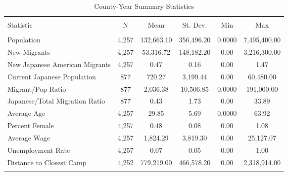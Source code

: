 
\begin{table}[!htbp] \centering 
  \caption{County-Year Summary Statistics} 
  \label{ctysumstats} 
\begin{tabular}{@{\extracolsep{5pt}}lccccc} 
\\[-1.8ex]\hline 
\hline \\[-1.8ex] 
Statistic & \multicolumn{1}{c}{N} & \multicolumn{1}{c}{Mean} & \multicolumn{1}{c}{St. Dev.} & \multicolumn{1}{c}{Min} & \multicolumn{1}{c}{Max} \\ 
\hline \\[-1.8ex] 
Population & 4,257 & 132,663.10 & 356,496.20 & 0.0000 & 7,495,400.00 \\ 
New Migrants & 4,257 & 53,316.72 & 148,182.20 & 0.00 & 3,216,300.00 \\ 
New Japanese American Migrants & 4,257 & 0.47 & 0.16 & 0.00 & 1.47 \\ 
Current Japanese Population & 877 & 720.27 & 3,199.44 & 0.00 & 60,480.00 \\ 
Migrant/Pop Ratio & 877 & 2,036.38 & 10,506.85 & 0.0000 & 191,000.00 \\ 
Japanese/Total Migration Ratio & 877 & 0.43 & 1.73 & 0.00 & 33.89 \\ 
Average Age & 4,257 & 29.85 & 5.69 & 0.0000 & 63.92 \\ 
Percent Female & 4,257 & 0.48 & 0.08 & 0.00 & 1.08 \\ 
Average Wage & 4,257 & 1,824.29 & 3,819.30 & 0.00 & 25,127.07 \\ 
Unemployment Rate & 4,257 & 0.07 & 0.05 & 0.00 & 1.00 \\ 
Distance to Closest Camp & 4,252 & 779,219.00 & 466,578.20 & 0.00 & 2,318,914.00 \\ 
\hline \\[-1.8ex] 
\end{tabular} 
\end{table} 
